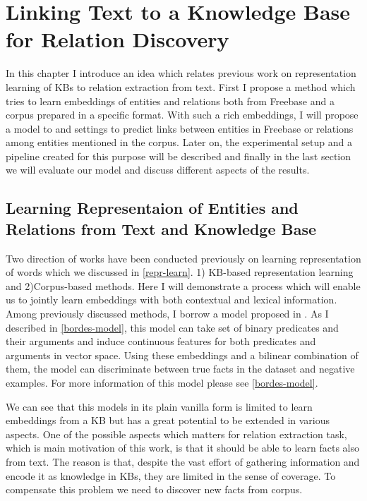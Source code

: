 \chapter{Linking Text to a Knowledge Base for Relation Discovery}
\label{ch:text-kb}

In this chapter I introduce an idea which relates previous work on
representation learning of KBs to relation extraction from text. First I propose
a method which tries to learn embeddings of entities and relations both from
Freebase and a corpus prepared in a specific format. With such a rich
embeddings, I will propose a model to and settings to predict links between
entities in Freebase or relations among entities mentioned in the corpus.
Later on, the experimental setup and a pipeline created for this purpose will be
described and finally in the last section we will evaluate our model and discuss
different aspects of the results.

\section{Learning Representaion of Entities and Relations
from Text and Knowledge Base}
\label{sec:dataset}

Two direction of works have been conducted previously on learning representation
of words which we discussed in \ref{repr-learn}. 1) KB-based
representation learning and 2)Corpus-based methods. Here I will demonstrate a
process which will enable us to jointly learn embeddings with both contextual
and lexical information. Among previously discussed methods, I borrow a model
proposed in \cite{Bordes2012}. As I described in \ref{bordes-model}, this model
can take set of binary predicates and their arguments and induce continuous
features for both predicates and arguments in vector space. Using these
embeddings and a bilinear combination of them, the model can discriminate
between true facts in the dataset and negative examples. For more information of
this model please see \ref{bordes-model}.

We can see that this models in its plain vanilla form is limited to learn
embeddings from a KB but has a great potential to be extended in various
aspects. One of the possible aspects which matters for relation extraction task,
which is main motivation of this work, is that it should be able to learn facts
also from text. The reason is that, despite the vast effort of gathering
information and encode it as knowledge in KBs, they are limited in the sense of
coverage. To compensate this problem we need to discover new facts from corpus.

